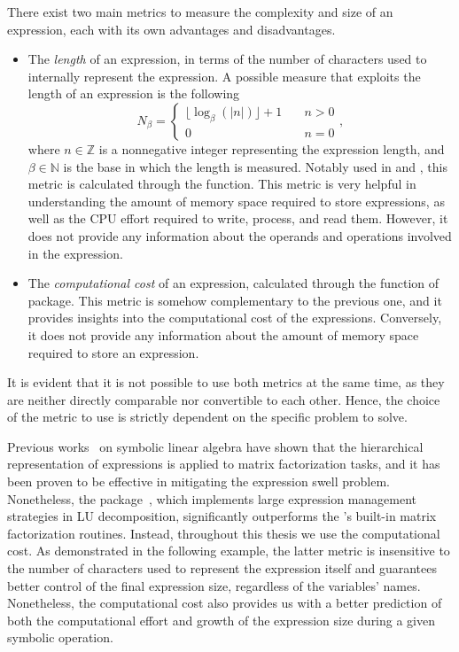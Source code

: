 There exist two main metrics to measure the complexity and size of an expression, each with its own advantages and disadvantages.
%
\begin{itemize}
  \setlength\itemsep{0.0em}
  \item The \emph{length} of an expression, in terms of the number of characters used to internally represent the expression. A possible measure that exploits the length of an expression is the following
  \begin{equation*}
    N_\beta = \begin{cases}
      \lfloor\log_{\beta}(|n|)\rfloor + 1 & \quad n > 0 \\
      0                                   & \quad n = 0
    \end{cases},
  \end{equation*}
  where $n \in \mathbb{Z}$ is a nonnegative integer representing the expression length, and $\beta \in \mathbb{N}$ is the base in which the length is measured.
  Notably used in \citet{carette2006linear} and \citet{zhou2006hierarchical}, this metric is calculated through the  \Maple{} function. This metric is very helpful in understanding the amount of memory space required to store expressions, as well as the \ac{CPU} effort required to write, process, and read them. However, it does not provide any information about the operands and operations involved in the expression.
  \item The \emph{computational cost} of an expression, calculated through the  function of  package. This metric is somehow complementary to the previous one, and it provides insights into the computational cost of the expressions. Conversely, it does not provide any information about the amount of memory space required to store an expression.
\end{itemize}
%
It is evident that it is not possible to use both metrics at the same time, as they are neither directly comparable nor convertible to each other. Hence, the choice of the metric to use is strictly dependent on the specific problem to solve.

Previous works~\cite{carette2006linear, zhou2006hierarchical} on symbolic linear algebra have shown that the hierarchical representation of expressions is applied to matrix factorization tasks, and it has been proven to be effective in mitigating the expression swell problem. Nonetheless, the \LULEM{} package~\cite{carette2006linear}, which implements large expression management strategies in \ac{LU} decomposition, significantly outperforms the \Maple{}'s built-in matrix factorization routines. Instead, throughout this thesis we use the computational cost. As demonstrated in the following example, the latter metric is insensitive to the number of characters used to represent the expression itself and guarantees better control of the final expression size, regardless of the variables' names. Nonetheless, the computational cost also provides us with a better prediction of both the computational effort and growth of the expression size during a given symbolic operation.

